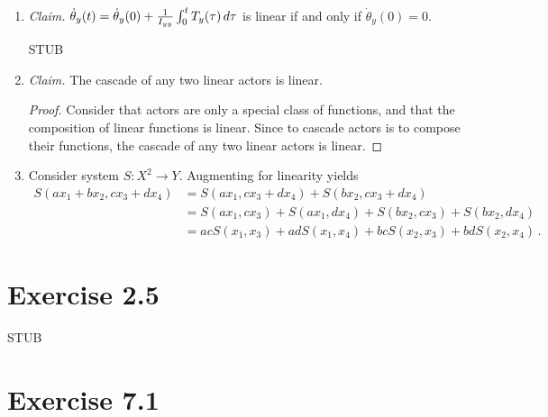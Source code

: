\documentclass{abrice}
\begin{document}
\begin{enumerate}[label= (\alph*)]
\item \textit{Claim.}
  $\dot{\theta}_y(t) = \dot{\theta}_y(0) + {1 \over I_{yy}} \int_0^t T_y(\tau)\,
  d\tau$ is linear if and only if $\dot{\theta}_y(0) = 0$.

  STUB

\item \textit{Claim.} The cascade of any two linear actors is linear.
  \begin{proof}
    Consider that actors are only a special class of functions, and that the
    composition of linear functions is linear. Since to cascade actors is to
    compose their functions, the cascade of any two linear actors is linear.
  \end{proof}
\item Consider system $S\colon X^2 \rightarrow Y$. Augmenting for linearity
  yields
  \begin{align*}
    S(ax_1 + bx_2, cx_3 + dx_4)
    &= S(ax_1,cx_3 + dx_4) + S(bx_2,cx_3 + dx_4) \\
    &= S(ax_1,cx_3) + S(ax_1,dx_4) + S(bx_2,cx_3) + S(bx_2,dx_4) \\
    &= acS(x_1, x_3) + adS(x_1, x_4) + bcS(x_2, x_3) + bdS(x_2, x_4)\, .
  \end{align*}
\end{enumerate}

\section{Exercise 2.5}

STUB

\section{Exercise 7.1}
\end{document}
